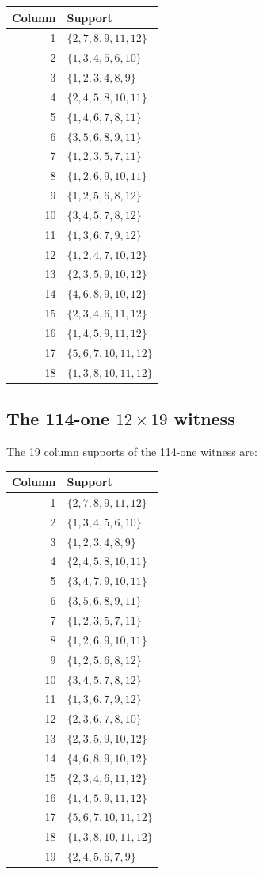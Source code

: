 \documentclass[11pt]{article}
\begin{document}
\begin{longtable}{r l}
\toprule
Column & Support \\
\midrule
\endhead
1 & $\{2,7,8,9,11,12\}$ \\
2 & $\{1,3,4,5,6,10\}$ \\
3 & $\{1,2,3,4,8,9\}$ \\
4 & $\{2,4,5,8,10,11\}$ \\
5 & $\{1,4,6,7,8,11\}$ \\
6 & $\{3,5,6,8,9,11\}$ \\
7 & $\{1,2,3,5,7,11\}$ \\
8 & $\{1,2,6,9,10,11\}$ \\
9 & $\{1,2,5,6,8,12\}$ \\
10 & $\{3,4,5,7,8,12\}$ \\
11 & $\{1,3,6,7,9,12\}$ \\
12 & $\{1,2,4,7,10,12\}$ \\
13 & $\{2,3,5,9,10,12\}$ \\
14 & $\{4,6,8,9,10,12\}$ \\
15 & $\{2,3,4,6,11,12\}$ \\
16 & $\{1,4,5,9,11,12\}$ \\
17 & $\{5,6,7,10,11,12\}$ \\
18 & $\{1,3,8,10,11,12\}$ \\
\bottomrule
\end{longtable}

\subsection{The 114-one $12\times19$ witness}
The 19 column supports of the 114-one witness are:

\begin{longtable}{r l}
\toprule
Column & Support \\
\midrule
\endhead
1 & $\{2,7,8,9,11,12\}$ \\
2 & $\{1,3,4,5,6,10\}$ \\
3 & $\{1,2,3,4,8,9\}$ \\
4 & $\{2,4,5,8,10,11\}$ \\
5 & $\{3,4,7,9,10,11\}$ \\
6 & $\{3,5,6,8,9,11\}$ \\
7 & $\{1,2,3,5,7,11\}$ \\
8 & $\{1,2,6,9,10,11\}$ \\
9 & $\{1,2,5,6,8,12\}$ \\
10 & $\{3,4,5,7,8,12\}$ \\
11 & $\{1,3,6,7,9,12\}$ \\
12 & $\{2,3,6,7,8,10\}$ \\
13 & $\{2,3,5,9,10,12\}$ \\
14 & $\{4,6,8,9,10,12\}$ \\
15 & $\{2,3,4,6,11,12\}$ \\
16 & $\{1,4,5,9,11,12\}$ \\
17 & $\{5,6,7,10,11,12\}$ \\
18 & $\{1,3,8,10,11,12\}$ \\
19 & $\{2,4,5,6,7,9\}$ \\
\bottomrule
\end{longtable}
\end{document}
